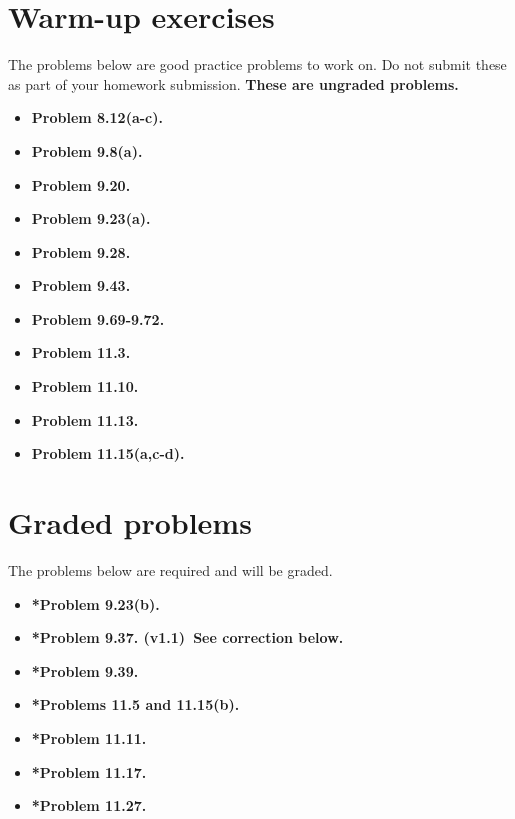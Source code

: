 \documentclass[11pt]{article}
\begin{document}
\vspace{0.2in}


\newpage
\section*{Warm-up exercises}
The problems below are good practice problems to work on.
Do not submit these as part of your homework submission.
\textbf{These are ungraded problems.}

\begin{multicols}{2}
\begin{itemize}

\item \textbf{Problem 8.12(a-c).}
\item \textbf{Problem 9.8(a).}
\item \textbf{Problem 9.20.}
\item \textbf{Problem 9.23(a).}
\item \textbf{Problem 9.28.}
\item \textbf{Problem 9.43.}
\item \textbf{Problem 9.69-9.72.}
\item \textbf{Problem 11.3.}
\item \textbf{Problem 11.10.}
\item \textbf{Problem 11.13.}
\item \textbf{Problem 11.15(a,c-d).}

\end{itemize}
\end{multicols}

\section*{Graded problems}
The problems below are required and will be graded.
\begin{itemize}

\item \textbf{*Problem 9.23(b).}
\item \textbf{*Problem 9.37. (v1.1)~See correction below.}
\item \textbf{*Problem 9.39.}
\item \textbf{*Problems 11.5 and 11.15(b).}
\item \textbf{*Problem 11.11.}
\item \textbf{*Problem 11.17.}
\item \textbf{*Problem 11.27.}

\end{itemize}
\end{document}
